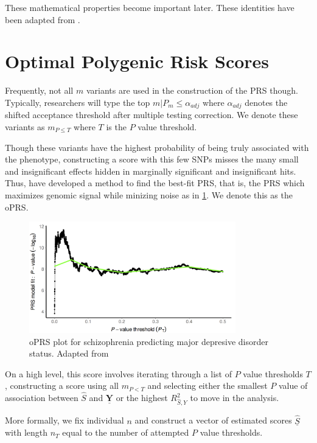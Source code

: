 These mathematical properties become important later. These identities have been adapted from \cite{Dudbridge2013}.

\section{Optimal Polygenic Risk Scores}

Frequently, not all $m$ variants are used in the construction of the \ac{PRS} though. Typically, researchers will type the top $m | P_m \leq \alpha_{adj}$ where $\alpha_{adj}$ denotes the shifted acceptance threshold after multiple testing correction. We denote these variants as $m_{P \leq T}$ where $T$ is the $P$ value threshold. 

Though these variants have the highest probability of being truly associated with the phenotype, constructing a score with this few \ac{SNP}s misses the many small and insignificant effects hidden in marginally significant and insignificant hits. Thus, \cite{Euesden2014} have developed a method to find the best-fit \ac{PRS}, that is, the PRS which maximizes genomic signal while minizing noise as in \ref{pt}. We denote this as the \ac{oPRS}. 

\begin{figure}[h]
\label{pt}
\caption{\ac{oPRS} plot for schizophrenia predicting major depresive disorder status. Adapted from \cite{Euesden2014}}
\centering
\includegraphics[width=0.8\textwidth]{Figures/pt.png}
\end{figure}

On a high level, this score involves iterating through a list of $P$ value thresholds $T$, constructing a score using all $m_{P < T}$ and selecting either the smallest $P$ value of association between $\hat{S}$ and $\underline{\mathbf{Y}}$ or the highest $R^2_{\hat{S}, Y}$ to move in the analysis. 

More formally, we fix individual $n$ and construct a vector of estimated scores $\underline{\hat{S}}$ with length $n_T$ equal to the number of attempted $P$ value thresholds. 

